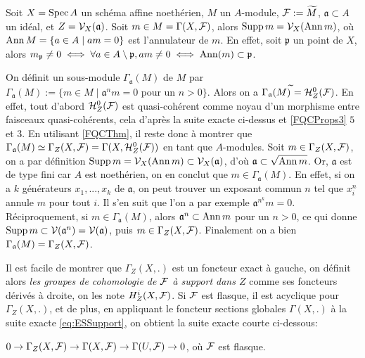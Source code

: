 \begin{ex}\label{cohomsupportaffineex}
Soit $X=\operatorname{Spec} A$ un schéma affine noethérien, $M$ un $A$-module, $\mathcal{F}:=\widetilde{M}$, $\mathfrak{a}\subset A$ un idéal, et $Z=\mathcal{V}_X(\mathfrak{a})$. Soit $m\in M=\Gamma(X,\mathcal{F})$, alors $\operatorname{Supp} m=\mathcal{V}_X(\operatorname{Ann} m)$, où $\operatorname{Ann} M=\lbrace a\in A\mid am=0\rbrace$ est l'annulateur de $m$. En effet, soit $\mathfrak{p}$ un point de $X$, alors $m_\mathfrak{p}\neq 0\iff \forall a\in A\setminus \mathfrak{p}, am\neq 0\iff \operatorname{Ann}(m)\subset \mathfrak{p}$.

On définit un sous-module $\Gamma_\mathfrak{a}(M)$ de $M$ par $\Gamma_\mathfrak{a}(M):=\lbrace m\in M\mid \mathfrak{a}^nm=0 \text{ pour un } n>0 \rbrace$. Alors on a $\Gamma_\mathfrak{a}(M)^{\widetilde{}} = \mathcal{H} ^0 _Z(\mathcal{F})$. En effet, tout d'abord $\mathcal{H}^0 _Z(\mathcal{F})$ est quasi-cohérent comme noyau d'un morphisme entre faisceaux quasi-cohérents, cela d'après la suite exacte ci-dessus et \ref{FQCProps3} $5$ et $3$. En utilisant \ref{FQCThm}, il reste donc à montrer que $\Gamma_\mathfrak{a}(M)\simeq\Gamma_Z(X,\mathcal{F})=\Gamma(X,\mathcal{H} ^0 _Z(\mathcal{F}))$ en tant que $A$-modules. Soit $m\in\Gamma_Z(X,\mathcal{F})$, on a par définition $\operatorname{Supp} m=\mathcal{V}_X(\operatorname{Ann} m)\subset \mathcal{V}_X(\mathfrak{a})$, d'où $\mathfrak{a}\subset \sqrt{\operatorname{Ann} m}$. Or, $\mathfrak{a}$ est de type fini car $A$ est noethérien, on en conclut que $m\in \Gamma_\mathfrak{a}(M)$. En effet, si on a $k$ générateurs $x_1,...,x_k$ de $\mathfrak{a}$, on peut trouver un exposant commun $n$ tel que $x^n_i$ annule $m$ pour tout $i$. Il s'en suit que l'on a par exemple $\mathfrak{a}^{n^k}m=0$. Réciproquement, si $m\in \Gamma_\mathfrak{a}(M)$, alors $\mathfrak{a}^n\subset \operatorname{Ann} m$ pour un $n>0$, ce qui donne $\operatorname{Supp} m \subset\mathcal{V}(\mathfrak{a}^n)=\mathcal{V}(\mathfrak{a})$, puis $m\in \Gamma_Z(X,\mathcal{F})$. Finalement on a bien $\Gamma_\mathfrak{a}(M)=\Gamma_Z(X,\mathcal{F})$.
\end{ex}

Il est facile de montrer que $\Gamma_Z(X, .)$ est un foncteur exact à gauche, on définit alors \textit{les groupes de cohomologie de $\mathcal{F}$ à support dans $Z$} comme ses foncteurs dérivés à droite, on les note $H_Z^i(X,\mathcal{F})$. Si $\mathcal{F}$ est flasque, il est acyclique pour $\Gamma_Z(X, .)$, et de plus, en appliquant le foncteur sections globales $\Gamma(X,.)$ à la suite exacte \ref{eq:ESSupport}, on obtient la suite exacte courte ci-dessous:

\begin{center}
$0\rightarrow \Gamma_Z(X,\mathcal{F})\rightarrow \Gamma(X,\mathcal{F})\rightarrow \Gamma(U,\mathcal{F})\rightarrow 0$, où $\mathcal{F}$ est flasque.
\end{center}

